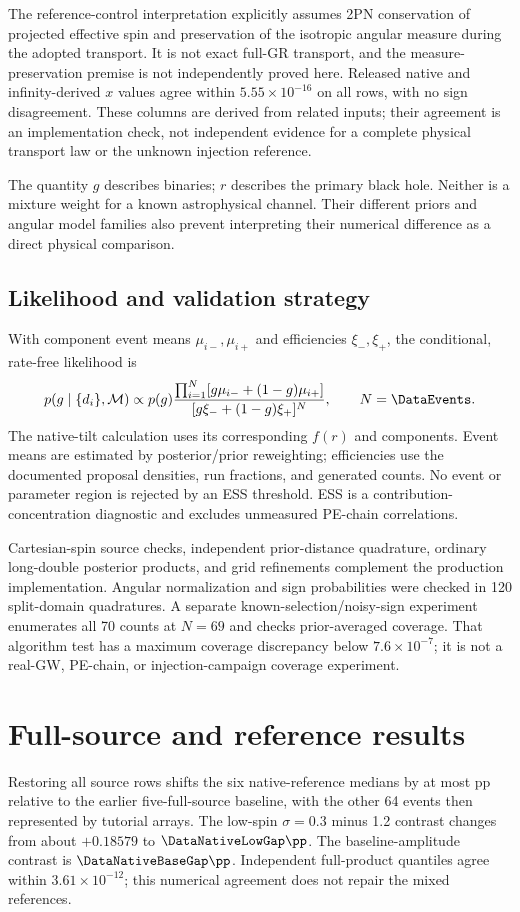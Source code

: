 The reference-control interpretation explicitly assumes 2PN conservation of projected effective spin and preservation of the isotropic angular measure during the adopted transport. It is not exact full-GR transport, and the measure-preservation premise is not independently proved here. Released native and infinity-derived $x$ values agree within $5.55\times10^{-16}$ on all rows, with no sign disagreement. These columns are derived from related inputs; their agreement is an implementation check, not independent evidence for a complete physical transport law or the unknown injection reference.

The quantity $g$ describes binaries; $r$ describes the primary black hole. Neither is a mixture weight for a known astrophysical channel. Their different priors and angular model families also prevent interpreting their numerical difference as a direct physical comparison.

\subsection{Likelihood and validation strategy}
With component event means $\mu_{i-},\mu_{i+}$ and efficiencies $\xi_-,\xi_+$, the conditional, rate-free likelihood is
\begin{equation}
 p(g\mid\{d_i\},{\cal M})\propto p(g)
 \frac{\prod_{i=1}^{N}[g\mu_{i-}+(1-g)\mu_{i+}]}
 {[g\xi_-+(1-g)\xi_+]^N},\qquad N=\DataEvents.\label{eq:likelihood}
\end{equation}
The native-tilt calculation uses its corresponding $f(r)$ and components. Event means are estimated by posterior/prior reweighting; efficiencies use the documented proposal densities, run fractions, and generated counts. No event or parameter region is rejected by an ESS threshold. ESS is a contribution-concentration diagnostic and excludes unmeasured PE-chain correlations.

Cartesian-spin source checks, independent prior-distance quadrature, ordinary long-double posterior products, and grid refinements complement the production implementation. Angular normalization and sign probabilities were checked in 120 split-domain quadratures. A separate known-selection/noisy-sign experiment enumerates all 70 counts at $N=69$ and checks prior-averaged coverage. That algorithm test has a maximum coverage discrepancy below $7.6\times10^{-7}$; it is not a real-GW, PE-chain, or injection-campaign coverage experiment.

\section{Full-source and reference results}\label{sec:results}
Restoring all source rows shifts the six native-reference medians by at most \DataMaxSourceShift{} pp relative to the earlier five-full-source baseline, with the other 64 events then represented by tutorial arrays. The low-spin $\sigma=0.3$ minus 1.2 contrast changes from about $+0.18579$ to $\DataNativeLowGap\pp$. The baseline-amplitude contrast is $\DataNativeBaseGap\pp$. Independent full-product quantiles agree within $3.61\times10^{-12}$; this numerical agreement does not repair the mixed references.

